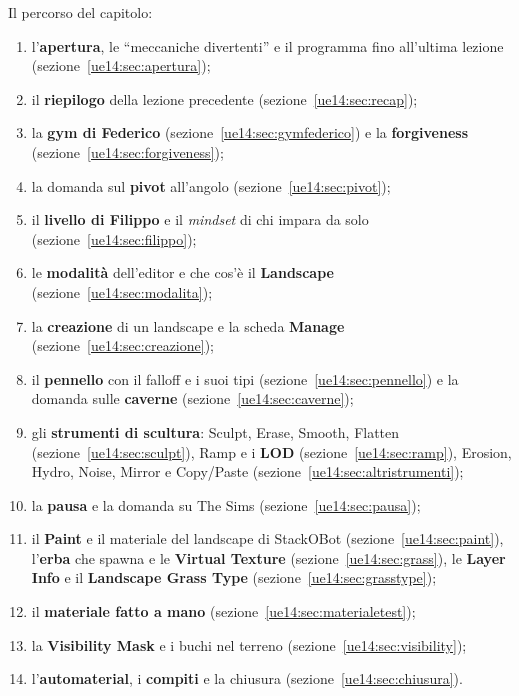 Il percorso del capitolo:
\begin{enumerate}
  \item l'\textbf{apertura}, le ``meccaniche divertenti'' e il programma fino all'ultima
        lezione (sezione~\ref{ue14:sec:apertura});
  \item il \textbf{riepilogo} della lezione precedente (sezione~\ref{ue14:sec:recap});
  \item la \textbf{gym di Federico} (sezione~\ref{ue14:sec:gymfederico}) e la
        \textbf{forgiveness} (sezione~\ref{ue14:sec:forgiveness});
  \item la domanda sul \textbf{pivot} all'angolo (sezione~\ref{ue14:sec:pivot});
  \item il \textbf{livello di Filippo} e il \emph{mindset} di chi impara da solo
        (sezione~\ref{ue14:sec:filippo});
  \item le \textbf{modalità} dell'editor e che cos'è il \textbf{Landscape}
        (sezione~\ref{ue14:sec:modalita});
  \item la \textbf{creazione} di un landscape e la scheda \textbf{Manage}
        (sezione~\ref{ue14:sec:creazione});
  \item il \textbf{pennello} con il falloff e i suoi tipi
        (sezione~\ref{ue14:sec:pennello}) e la domanda sulle \textbf{caverne}
        (sezione~\ref{ue14:sec:caverne});
  \item gli \textbf{strumenti di scultura}: Sculpt, Erase, Smooth, Flatten
        (sezione~\ref{ue14:sec:sculpt}), Ramp e i \textbf{LOD}
        (sezione~\ref{ue14:sec:ramp}), Erosion, Hydro, Noise, Mirror e Copy/Paste
        (sezione~\ref{ue14:sec:altristrumenti});
  \item la \textbf{pausa} e la domanda su The Sims (sezione~\ref{ue14:sec:pausa});
  \item il \textbf{Paint} e il materiale del landscape di StackOBot
        (sezione~\ref{ue14:sec:paint}), l'\textbf{erba} che spawna e le \textbf{Virtual
        Texture} (sezione~\ref{ue14:sec:grass}), le \textbf{Layer Info} e il
        \textbf{Landscape Grass Type} (sezione~\ref{ue14:sec:grasstype});
  \item il \textbf{materiale fatto a mano} (sezione~\ref{ue14:sec:materialetest});
  \item la \textbf{Visibility Mask} e i buchi nel terreno
        (sezione~\ref{ue14:sec:visibility});
  \item l'\textbf{automaterial}, i \textbf{compiti} e la chiusura
        (sezione~\ref{ue14:sec:chiusura}).
\end{enumerate}

